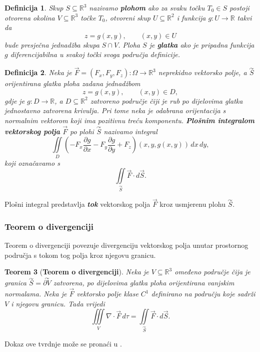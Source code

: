 \documentclass[12pt,a4paper]{article}
\makeatletter
\newtheorem{tm}{Teorem}[section]
\newtheorem{deff}[tm]{Definicija}
\renewenvironment{proof}[1][\proofname]{\par
  \pushQED{\qed}%
  \normalfont
  \topsep6\p@\@plus6\p@\relax
  \trivlist
  \item[\hskip\labelsep
  \bfseries #1\@addpunct{.}]\ignorespaces
}{%
  \popQED\endtrivlist\@endpefalse
}
\makeatother
\begin{document}
\begin{deff}
Skup $S\subseteq\mathbb{R}^3$ nazivamo \textbf{\textit{plohom}} ako za svaku
točku $T_0\in S$ postoji otvorena okolina $V\subseteq\mathbb{R}^3$ točke
$T_0$, otvoreni skup $U\subseteq\mathbb{R}^2$ i funkcija
$g:U\to\mathbb{R}$ takvi da
\[
z=g(x,y), \qquad (x,y)\in U
\]
bude presječna jednadžba skupa $S\cap V$. Ploha $S$ je
\textbf{\textit{glatka}} ako je pripadna funkcija $g$
diferencijabilna u svakoj točki svoga područja definicije.
\end{deff}

\begin{deff}
Neka je $\overrightarrow{F}=(F_x,F_y,F_z):\Omega\to\mathbb{R}^3$
neprekidno vektorsko polje, a $\overset{\curvearrowright}{S}$ orijentirana glatka ploha zadana
jednadžbom
\[
z=g(x,y), \qquad (x,y)\in D,
\]
gdje je $g:D\to\mathbb{R}$, a $D\subseteq\mathbb{R}^2$ zatvoreno područje
čiji je rub po dijelovima glatka jednostavno zatvorena krivulja. Pri tome neka je odabrana
orijentacija s normalnim vektorom koji ima pozitivnu treću komponentu.
\textbf{\textit{Plošnim integralom vektorskog polja}}
$\overrightarrow{F}$ po plohi $\overset{\curvearrowright}{S}$ nazivamo integral
\[
\iint\limits_D
\left(
-F_x\frac{\partial g}{\partial x}
-F_y\frac{\partial g}{\partial y}
+F_z
\right)
(x,y,g(x,y))\,dx\,dy,
\]
koji označavamo s
\[
\iint\limits_{\overset{\curvearrowright}{S}}
\overrightarrow{F}\cdot d\overrightarrow{S}.
\]
\end{deff}

Plošni integral predstavlja \textbf{\textit{tok}} vektorskog polja $\overrightarrow{F}$ kroz
usmjerenu plohu $\overset{\curvearrowright}{S}$.

\subsubsection{Teorem o divergenciji}

Teorem o divergenciji povezuje divergenciju vektorskog polja unutar
prostornog područja s tokom tog polja kroz njegovu granicu.

\begin{tm}[\textbf{Teorem o divergenciji}]
Neka je $V\subseteq\mathbb{R}^3$ omeđeno područje čija je granica
$\overset{\curvearrowright}{S}=\overset{\curvearrowright}{\partial V}$ zatvorena, po dijelovima glatka ploha orijentirana
vanjskim normalama. Neka je $\overrightarrow{F}$ vektorsko polje klase $C^1$
definirano na području koje sadrži $V$ i njegovu granicu. Tada vrijedi
$$
\iiint\limits_V
\nabla\cdot\overrightarrow{F}\,d\tau
=
\iint\limits_{\overset{\curvearrowright}{S}}
\overrightarrow{F}\cdot d\overrightarrow{S}.
$$
\end{tm}
\begin{proof}
Dokaz ove tvrdnje može se pronaći u \cite{uglesic}.
\end{proof}
\end{document}
